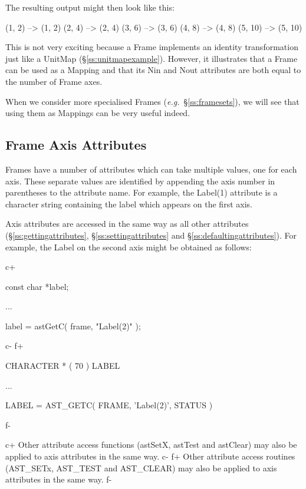 \documentclass[twoside,11pt]{starlink}
\providecommand{\secref}[1]{\S\ref{#1}}
\begin{document}
The resulting output might then look like this:

\begin{terminalv}
(1, 2) --> (1, 2)
(2, 4) --> (2, 4)
(3, 6) --> (3, 6)
(4, 8) --> (4, 8)
(5, 10) --> (5, 10)
\end{terminalv}

This is not very exciting because a Frame implements an identity
transformation just like a UnitMap
(\secref{ss:unitmapexample}). However, it illustrates that a Frame can
be used as a Mapping and that its Nin and Nout attributes are both
equal to the number of Frame axes.

When we consider more specialised Frames
(\emph{e.g.}~\secref{ss:framesets}), we will see that using them as
Mappings can be very useful indeed.

\subsection{\label{ss:frameaxisattributes}Frame Axis Attributes}

Frames have a number of attributes which can take multiple values, one
for each axis. These separate values are identified by appending the
axis number in parentheses to the attribute name. For example, the
Label(1) attribute is a character string containing the label which
appears on the first axis.

Axis attributes are accessed in the same way as all other attributes
(\secref{ss:gettingattributes}, \secref{ss:settingattributes} and
\secref{ss:defaultingattributes}). For example, the Label on the second
axis might be obtained as follows:

c+
\small
\begin{terminalv}
const char *label;

...

label = astGetC( frame, "Label(2)" );
\end{terminalv}
\normalsize
c-
f+
\small
\begin{terminalv}
      CHARACTER * ( 70 ) LABEL

      ...

      LABEL = AST_GETC( FRAME, 'Label(2)', STATUS )
\end{terminalv}
\normalsize
f-

c+
Other attribute access functions (astSetX, astTest and astClear) may
also be applied to axis attributes in the same way.
c-
f+
Other attribute access routines (AST\_SETx, AST\_TEST and AST\_CLEAR)
may also be applied to axis attributes in the same way.
f-
\end{document}
